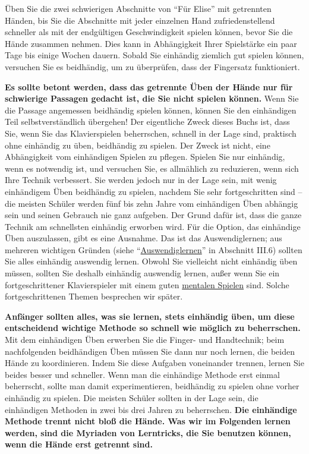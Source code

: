 Üben Sie die zwei schwierigen Abschnitte von \enquote{Für Elise} mit getrennten Händen, bis Sie die Abschnitte mit jeder einzelnen Hand zufriedenstellend schneller als mit der endgültigen Geschwindigkeit spielen können, bevor Sie die Hände zusammen nehmen.
Dies kann in Abhängigkeit Ihrer Spielstärke ein paar Tage bis einige Wochen dauern.
Sobald Sie einhändig ziemlich gut spielen können, versuchen Sie es beidhändig, um zu überprüfen, dass der Fingersatz funktioniert.

\textbf{Es sollte betont werden, dass das getrennte Üben der Hände nur für schwierige Passagen gedacht ist, die Sie nicht spielen können.}
Wenn Sie die Passage angemessen beidhändig spielen können, können Sie den einhändigen Teil selbstverständlich übergehen!
Der eigentliche Zweck dieses Buchs ist, dass Sie, wenn Sie das Klavierspielen beherrschen, schnell in der Lage sind, praktisch ohne einhändig zu üben, beidhändig zu spielen.
Der Zweck ist nicht, eine Abhängigkeit vom einhändigen Spielen zu pflegen.
Spielen Sie nur einhändig, wenn es notwendig ist, und versuchen Sie, es allmählich zu reduzieren, wenn sich Ihre Technik verbessert.
Sie werden jedoch nur in der Lage sein, mit wenig einhändigem Üben beidhändig zu spielen, nachdem Sie sehr fortgeschritten sind -- die meisten Schüler werden fünf bis zehn Jahre vom einhändigen Üben abhängig sein und seinen Gebrauch nie ganz aufgeben.
Der Grund dafür ist, dass die ganze Technik am schnellsten einhändig erworben wird.
Für die Option, das einhändige Üben auszulassen, gibt es eine Ausnahme.
Das ist das Auswendiglernen; aus mehreren wichtigen Gründen (siehe \enquote{\hyperref[c1iii6]{Auswendiglernen}} in Abschnitt III.6) sollten Sie alles einhändig auswendig lernen.
Obwohl Sie vielleicht nicht einhändig üben müssen, sollten Sie deshalb einhändig auswendig lernen, außer wenn Sie ein fortgeschrittener Klavierspieler mit einem guten \hyperref[c1ii12mental]{mentalen Spielen} sind.
Solche fortgeschrittenen Themen besprechen wir später.

\textbf{Anfänger sollten alles, was sie lernen, stets einhändig üben, um diese entscheidend wichtige Methode so schnell wie möglich zu beherrschen.}
Mit dem einhändigen Üben erwerben Sie die Finger- und Handtechnik; beim nachfolgenden beidhändigen Üben müssen Sie dann nur noch lernen, die beiden Hände zu koordinieren.
Indem Sie diese Aufgaben voneinander trennen, lernen Sie beides besser und schneller.
Wenn man die einhändige Methode erst einmal beherrscht, sollte man damit experimentieren, beidhändig zu spielen ohne vorher einhändig zu spielen.
Die meisten Schüler sollten in der Lage sein, die einhändigen Methoden in zwei bis drei Jahren zu beherrschen.
\textbf{Die einhändige Methode trennt nicht bloß die Hände.
Was wir im Folgenden lernen werden, sind die Myriaden von Lerntricks, die Sie benutzen können, wenn die Hände erst getrennt sind.}

